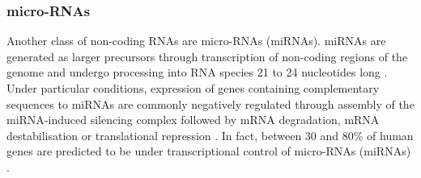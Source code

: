 \subsubsection{micro-RNAs} 
Another class of non-coding RNAs are micro-RNAs (miRNAs). miRNAs are generated as larger precursors through transcription of non-coding regions of the genome and undergo processing into RNA species 21 to 24 nucleotides long \parencite{Lee2002}. Under particular conditions, expression of genes containing complementary sequences to miRNAs are commonly negatively regulated through assembly of the miRNA-induced silencing complex followed by mRNA degradation, mRNA destabilisation or translational repression \parencite{Ameres2010,Braun2011,Petersen2006}. In fact, between 30 and 80\% of human genes are predicted to be under transcriptional control of micro-RNAs (miRNAs) \parencite{Lewis2005, Friedman2008}. %




